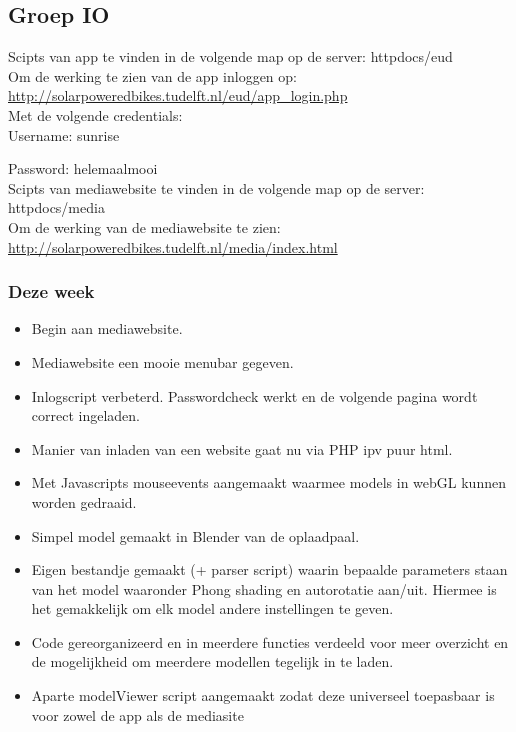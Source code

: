 \subsection*{Groep IO}

Scipts van app te vinden in de volgende map op de server: httpdocs/eud\\

Om de werking te zien van de app inloggen op:\\

\url{http://solarpoweredbikes.tudelft.nl/eud/app_login.php}\\

Met de volgende credentials:\\

Username: sunrise

Password: helemaalmooi\\

\noindent
Scipts van mediawebsite te vinden in de volgende map op de server: httpdocs/media\\

Om de werking van de mediawebsite te zien:\\

\url{http://solarpoweredbikes.tudelft.nl/media/index.html}\\

\subsubsection*{Deze week}

\begin{itemize}

\item
Begin aan mediawebsite.

\item
Mediawebsite een mooie menubar gegeven.

\item
Inlogscript verbeterd. Passwordcheck werkt en de volgende pagina wordt correct ingeladen.

\item
Manier van inladen van een website gaat nu via PHP ipv puur html.

\item 
Met Javascripts mouseevents aangemaakt waarmee models in webGL kunnen worden gedraaid.

\item 
Simpel model gemaakt in Blender van de oplaadpaal.

\item
Eigen bestandje gemaakt (+ parser script) waarin bepaalde parameters staan van het model waaronder Phong shading en autorotatie aan/uit. Hiermee is het gemakkelijk om elk model andere instellingen te geven.

\item
Code gereorganizeerd en in meerdere functies verdeeld voor meer overzicht en de mogelijkheid om meerdere modellen tegelijk in te laden.

\item
Aparte modelViewer script aangemaakt zodat deze universeel toepasbaar is voor zowel de app als de mediasite

\end{itemize}

